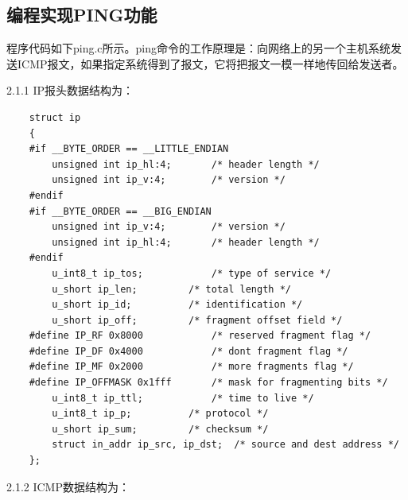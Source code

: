 \documentclass[a4paper,UTF8]{article}
\begin{document}
\subsection{编程实现PING功能}
程序代码如下ping.c所示。ping命令的工作原理是：向网络上的另一个主机系统发送ICMP报文，如果指定系统得到了报文，它将把报文一模一样地传回给发送者。\\
\item[2.1.1] IP报头数据结构为：
\begin{lstlisting}
    struct ip
    {
    #if __BYTE_ORDER == __LITTLE_ENDIAN
        unsigned int ip_hl:4;       /* header length */
        unsigned int ip_v:4;        /* version */
    #endif
    #if __BYTE_ORDER == __BIG_ENDIAN
        unsigned int ip_v:4;        /* version */
        unsigned int ip_hl:4;       /* header length */
    #endif
        u_int8_t ip_tos;            /* type of service */
        u_short ip_len;         /* total length */
        u_short ip_id;          /* identification */
        u_short ip_off;         /* fragment offset field */
    #define IP_RF 0x8000            /* reserved fragment flag */
    #define IP_DF 0x4000            /* dont fragment flag */
    #define IP_MF 0x2000            /* more fragments flag */
    #define IP_OFFMASK 0x1fff       /* mask for fragmenting bits */
        u_int8_t ip_ttl;            /* time to live */
        u_int8_t ip_p;          /* protocol */
        u_short ip_sum;         /* checksum */
        struct in_addr ip_src, ip_dst;  /* source and dest address */
    };
\end{lstlisting}
\item[2.1.2] ICMP数据结构为：
\end{document}
